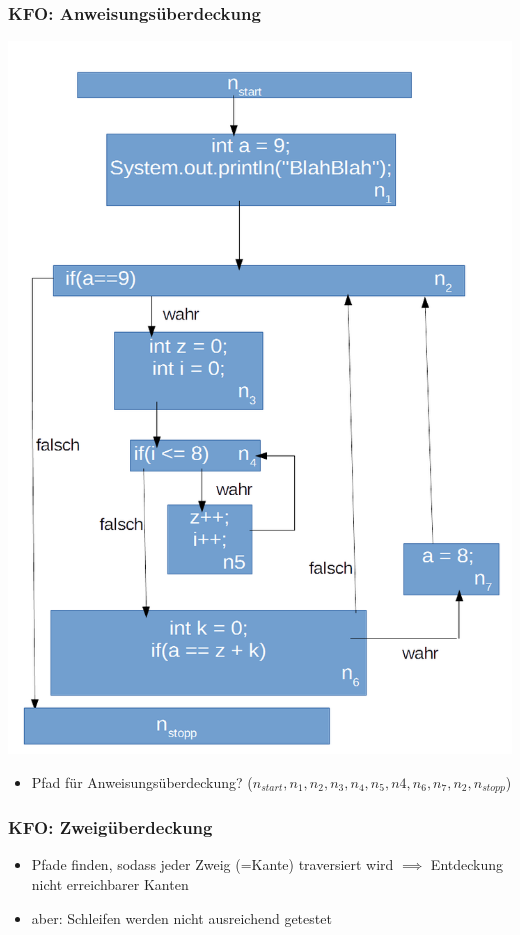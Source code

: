 \documentclass[18pt]{beamer}
\begin{document}
	\begin{frame}
		\frametitle{KFO: Anweisungsüberdeckung}
		\centering \includegraphics[scale=0.2]{./pics/tut5/test-without-goto.png}
		\begin{itemize}
			\item Pfad für Anweisungsüberdeckung? \pause ($n_{start}, n_1, n_2, n_3, n_4, n_5, n4, n_6, n_7, n_2, n_{stopp}$) 
		\end{itemize}
	\end{frame}

	\begin{frame}
		\frametitle{KFO: Zweigüberdeckung}
		\begin{itemize}
			\item Pfade finden, sodass jeder Zweig (=Kante) traversiert wird \pause
			\linebreak $\implies$ Entdeckung nicht erreichbarer Kanten \pause
			\item aber: Schleifen werden nicht ausreichend getestet
		\end{itemize}
	\end{frame}
\end{document}
